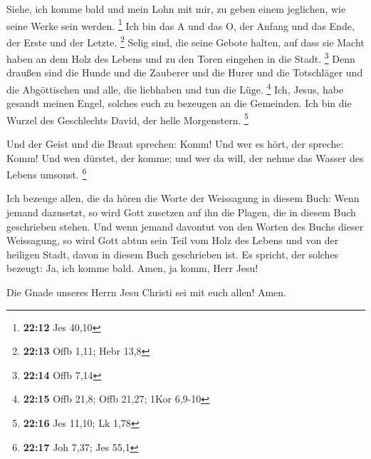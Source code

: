  Siehe, ich komme bald und mein Lohn mit mir, zu geben
einem jeglichen, wie seine Werke sein werden. \footnote{\textbf{22:12}
  Jes 40,10}  Ich bin das A und das O, der Anfang und das
Ende, der Erste und der Letzte. \footnote{\textbf{22:13} Offb 1,11; Hebr
  13,8}  Selig sind, die seine Gebote halten, auf dass
sie Macht haben an dem Holz des Lebens und zu den Toren eingehen in die
Stadt. \footnote{\textbf{22:14} Offb 7,14}  Denn draußen
sind die Hunde und die Zauberer und die Hurer und die Totschläger und
die Abgöttischen und alle, die liebhaben und tun die Lüge. \footnote{\textbf{22:15}
  Offb 21,8; Offb 21,27; 1Kor 6,9-10}  Ich, Jesus, habe
gesandt meinen Engel, solches euch zu bezeugen an die Gemeinden. Ich bin
die Wurzel des Geschlechts David, der helle Morgenstern. \footnote{\textbf{22:16}
  Jes 11,10; Lk 1,78}

 Und der Geist und die Braut sprechen: Komm! Und wer es
hört, der spreche: Komm! Und wen dürstet, der komme; und wer da will,
der nehme das Wasser des Lebens umsonst. \footnote{\textbf{22:17} Joh
  7,37; Jes 55,1}

 Ich bezeuge allen, die da hören die Worte der Weissagung
in diesem Buch: Wenn jemand dazusetzt, so wird Gott zusetzen auf ihn die
Plagen, die in diesem Buch geschrieben stehen.  Und wenn
jemand davontut von den Worten des Buchs dieser Weissagung, so wird Gott
abtun sein Teil vom Holz des Lebens und von der heiligen Stadt, davon in
diesem Buch geschrieben ist.  Es spricht, der solches
bezeugt: Ja, ich komme bald. Amen, ja komm, Herr Jesu!

 Die Gnade unseres Herrn Jesu Christi sei mit euch allen!
Amen.

